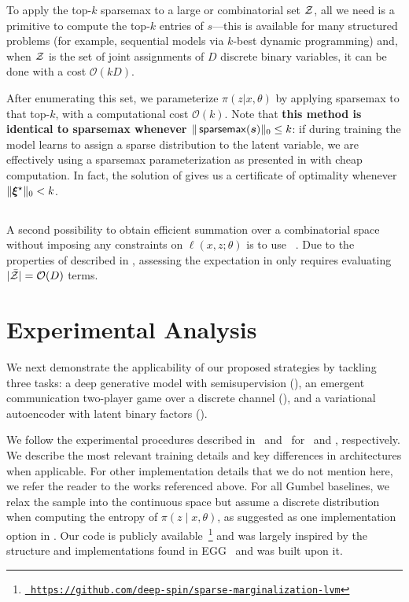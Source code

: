 To apply the top-$k$ sparsemax to a large or combinatorial set $\mathcal{Z}$,
all we need is a primitive to compute the top-$k$ entries of
$s$---this is available for many structured problems (for example,
sequential models via $k$-best dynamic programming) and, when $\mathcal{Z}$
is the set of joint assignments of $D$ discrete binary variables, it
can be done with a cost $\mathcal{O}(kD)$.

After enumerating this set, we parameterize $\pi(z|x,\theta)$ by
applying sparsemax to that top-$k$, with a
computational cost $\mathcal{O}(k)$. Note that {\bf this method is
        identical to sparsemax whenever $\|\operatorname*{\mathsf{sparsemax}}(\bm{s})\|_0 \le k$}: if
during training the model learns to assign a sparse distribution to
the latent variable, we are effectively using a sparsemax
parameterization as presented in  with cheap
computation. In fact, the solution of 
gives us a certificate of optimality whenever $\|\bm{\xi}^\star\|_0 < k$.

\subsection{\label{sec:smap}\smap}

A second possibility to obtain efficient summation over a
combinatorial space without imposing any constraints on $\ell(x, z;
    \theta)$ is to use \smap~\citep{niculae2018sparsemap, sparsemapcg}.
Due to the properties of \smap described in ,
assessing the expectation in  only requires evaluating
$|\bar{\mathcal{Z}}| = \mathcal{O}(D)$ terms.

\section{\label{sec:applications}Experimental Analysis}

We next demonstrate the applicability of our proposed strategies by
tackling three tasks: a deep generative model with semisupervision
(), an emergent communication two-player game over a
discrete channel (), and a variational autoencoder with
latent binary factors ().

We follow the experimental procedures described
in~\citep{RB19} and~\citep{Lazaridou2017} for~ and
, respectively. We describe the most relevant
training details and key differences in architectures when
applicable. For other implementation details that we do not mention
here, we refer the reader to the works referenced above. For all
Gumbel baselines, we relax the sample into the continuous space but
assume a discrete distribution when computing the entropy of $\pi(z
    \mid x, \theta)$, as suggested as one implementation option in
\citet{Concrete}. Our code is publicly available~\footnote{
    \href{https://github.com/deep-spin/sparse-marginalization-lvm}{\tt
        https://github.com/deep-spin/sparse-marginalization-lvm}} and was
largely inspired by the structure and implementations found in
EGG~\citep{Kharitonov2019} and was built upon it.

